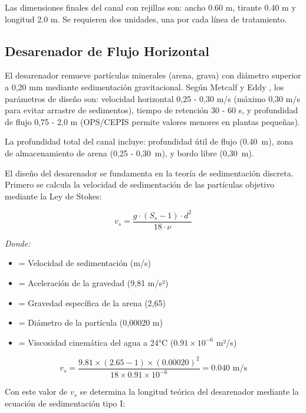 \documentclass[12pt,a4paper]{article}
\begin{document}
Las dimensiones finales del canal con rejillas son: ancho 0.60 m, tirante 0.40 m y longitud 2.0 m. Se requieren dos unidades, una por cada línea de tratamiento.

\subsection{Desarenador de Flujo Horizontal}

El desarenador remueve partículas minerales (arena, grava) con diámetro superior a 0,20 mm mediante sedimentación gravitacional. Según Metcalf y Eddy \cite{metcalf2014}, los parámetros de diseño son: velocidad horizontal 0,25 - 0,30 m/s (máximo 0,30 m/s para evitar arrastre de sedimentos), tiempo de retención 30 - 60 s, y profundidad de flujo 0,75 - 2,0 m (OPS/CEPIS \cite{ops2005} permite valores menores en plantas pequeñas).

La profundidad total del canal incluye: profundidad útil de flujo (0.40~m), zona de almacenamiento de arena (0,25 - 0,30~m), y bordo libre (0,30~m).

El diseño del desarenador se fundamenta en la teoría de sedimentación discreta. Primero se calcula la velocidad de sedimentación de las partículas objetivo mediante la Ley de Stokes:

\begin{equation}
v_s = \frac{g \cdot (S_s - 1) \cdot d^2}{18 \cdot \nu}
\end{equation}

\textit{Donde:}
\begin{itemize}[noitemsep,leftmargin=2em]
    \item[$v_s$] = Velocidad de sedimentación (m/s)
    \item[$g$] = Aceleración de la gravedad (9,81 m/s²)
    \item[$S_s$] = Gravedad específica de la arena (2,65)
    \item[$d$] = Diámetro de la partícula (0,00020 m)
    \item[$\nu$] = Viscosidad cinemática del agua a 24°C ($0.91 \times 10^{-6}$ m²/s)
\end{itemize}

\begin{equation}
v_s = \frac{9.81 \times (2.65 - 1) \times (0.00020)^2}{18 \times 0.91 \times 10^{-6}} = 0.040 \text{ m/s}
\end{equation}

Con este valor de $v_s$ se determina la longitud teórica del desarenador mediante la ecuación de sedimentación tipo I:
\end{document}

